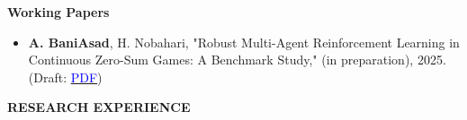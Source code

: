 \documentclass[12pt]{article}
\begin{document}
\noindent
{\bfseries Working Papers}

\begin{itemize} \itemsep -1pt %
	\item \textbf{A. BaniAsad}, H. Nobahari, "Robust Multi-Agent Reinforcement Learning in Continuous Zero-Sum Games: A Benchmark Study," (in preparation), 2025. (Draft: \href{https://github.com/alibaniasad1999/master-thesis/blob/main/Paper/ZS-MARL.pdf}{\textcolor{blue}{PDF}})
\end{itemize}



 \newpage
\begin{center}
	{\noindent \bfseries RESEARCH EXPERIENCE}
\end{center}

\vspace{8pt} %

\noindent
\end{document}
